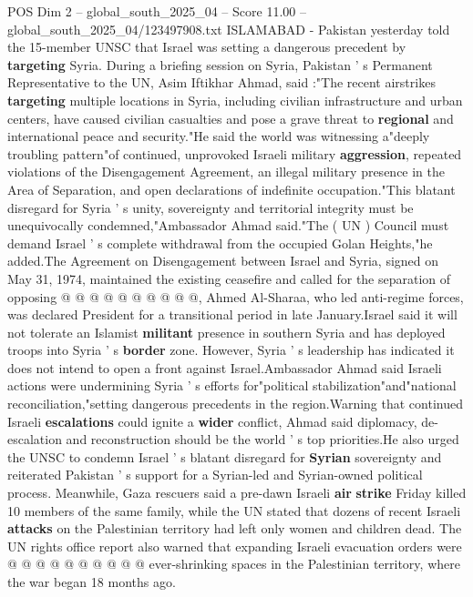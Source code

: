 \begin{textsample}{POS Dim 2 – global\_south\_2025\_04 – Score 11.00 – global\_south\_2025\_04/123497908.txt}  \label{ex:f2_pos_350}
ISLAMABAD - Pakistan yesterday told the 15-member UNSC that Israel was setting a dangerous precedent by \textbf{targeting} Syria.
During a briefing session on Syria, Pakistan ' s Permanent Representative to the UN, Asim Iftikhar Ahmad, said :"The recent airstrikes \textbf{targeting} multiple locations in Syria, including civilian infrastructure and urban centers, have caused civilian casualties and pose a grave threat to \textbf{regional} and international peace and security."He said the world was witnessing a"deeply troubling pattern"of continued, unprovoked Israeli military \textbf{aggression}, repeated violations of the Disengagement Agreement, an illegal military presence in the Area of Separation, and open declarations of indefinite occupation."This blatant disregard for Syria ' s unity, sovereignty and territorial integrity must be unequivocally condemned,"Ambassador Ahmad said."The ( UN ) Council must demand Israel ' s complete withdrawal from the occupied Golan Heights,"he added.The Agreement on Disengagement between Israel and Syria, signed on May 31, 1974, maintained the existing ceasefire and called for the separation of opposing @ @ @ @ @ @ @ @ @ @, Ahmed Al-Sharaa, who led anti-regime forces, was declared President for a transitional period in late January.Israel said it will not tolerate an Islamist \textbf{militant} presence in southern Syria and has deployed troops into Syria ' s \textbf{border} zone.
However, Syria ' s leadership has indicated it does not intend to open a front against Israel.Ambassador Ahmad said Israeli actions were undermining Syria ' s efforts for"political stabilization"and"national reconciliation,"setting dangerous precedents in the region.Warning that continued Israeli \textbf{escalations} could ignite a \textbf{wider} conflict, Ahmad said diplomacy, de-escalation and reconstruction should be the world ' s top priorities.He also urged the UNSC to condemn Israel ' s blatant disregard for \textbf{Syrian} sovereignty and reiterated Pakistan ' s support for a Syrian-led and Syrian-owned political process.
Meanwhile, Gaza rescuers said a pre-dawn Israeli \textbf{air} \textbf{strike} Friday killed 10 members of the same family, while the UN stated that dozens of recent Israeli \textbf{attacks} on the Palestinian territory had left only women and children dead.
The UN rights office report also warned that expanding Israeli evacuation orders were @ @ @ @ @ @ @ @ @ @ ever-shrinking spaces in the Palestinian territory, where the war began 18 months ago.

\end{textsample}

